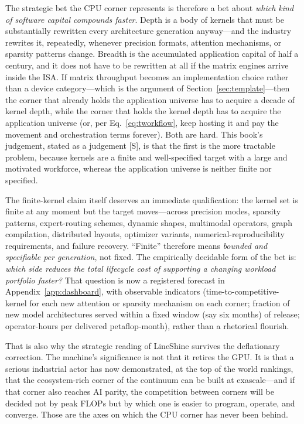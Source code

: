 The strategic bet the CPU corner represents is therefore a bet about \emph{which kind of software capital compounds faster}. Depth is a body of kernels that must be substantially rewritten every architecture generation anyway---and the industry rewrites it, repeatedly, whenever precision formats, attention mechanisms, or sparsity patterns change. Breadth is the accumulated application capital of half a century, and it does not have to be rewritten at all if the matrix engines arrive inside the ISA. If matrix throughput becomes an implementation choice rather than a device category---which is the argument of Section~\ref{sec:template}---then the corner that already holds the application universe has to acquire a decade of kernel depth, while the corner that holds the kernel depth has to acquire the application universe (or, per Eq.~\eqref{eq:tworkflow}, keep hosting it and pay the movement and orchestration terms forever). Both are hard. This book's judgement, stated as a judgement [S], is that the first is the more tractable problem, because kernels are a finite and well-specified target with a large and motivated workforce, whereas the application universe is neither finite nor specified.

The finite-kernel claim itself deserves an immediate qualification: the kernel set is finite at any moment but the target moves---across precision modes, sparsity patterns, expert-routing schemes, dynamic shapes, multimodal operators, graph compilation, distributed layouts, optimizer variants, numerical-reproducibility requirements, and failure recovery. ``Finite'' therefore means \emph{bounded and specifiable per generation}, not fixed. The empirically decidable form of the bet is: \emph{which side reduces the total lifecycle cost of supporting a changing workload portfolio faster?} That question is now a registered forecast in Appendix~\ref{app:dashboard}, with observable indicators (time-to-competitive-kernel for each new attention or sparsity mechanism on each corner; fraction of new model architectures served within a fixed window (say six months) of release; operator-hours per delivered petaflop-month), rather than a rhetorical flourish.

That is also why the strategic reading of LineShine survives the deflationary correction. The machine's significance is not that it retires the GPU. It is that a serious industrial actor has now demonstrated, at the top of the world rankings, that the ecosystem-rich corner of the continuum can be built at exascale---and if that corner also reaches AI parity, the competition between corners will be decided not by peak FLOPs but by which one is easier to program, operate, and converge. Those are the axes on which the CPU corner has never been behind.

